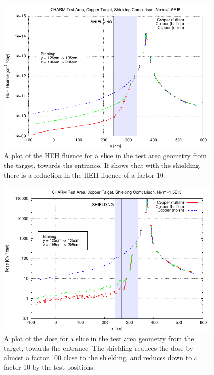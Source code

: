 \begin{figure}[ht!]
	\centering
	\includegraphics[scale=1.1]{./images/heh_comparison_with_shielding}
	\caption{A plot of the HEH fluence for a slice in the test area geometry from the target, towards the entrance. It shows that with the shielding, there is a reduction in the HEH fluence of a factor 10.}
	\label{fig:HEH_copper_shielding}
\end{figure}

\begin{figure}[ht!]
	\centering
	\includegraphics[scale=1.1]{./images/dose_comparison_with_shielding}
	\caption{A plot of the dose for a slice in the test area geometry from the target, towards the entrance. The shielding reduces the dose by almost a factor 100 close to the shielding, and reduces down to a factor 10 by the test positions.}
	\label{fig:dose_copper_shielding}
\end{figure}

